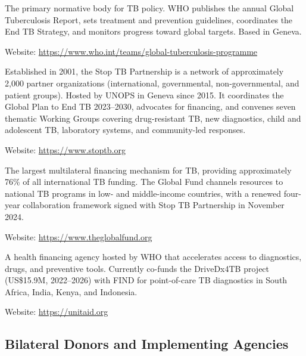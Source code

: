 \documentclass[11pt]{article}
\begin{document}
\begin{description}[style=nextline]

  \item[World Health Organization (WHO) -- Global TB Programme]
  The primary normative body for TB policy. WHO publishes the annual Global Tuberculosis Report, sets treatment and prevention guidelines, coordinates the End TB Strategy, and monitors progress toward global targets. Based in Geneva. 
  
  Website: \url{https://www.who.int/teams/global-tuberculosis-programme}

  \item[Stop TB Partnership]
  Established in 2001, the Stop TB Partnership is a network of approximately 2,000 partner organizations (international, governmental, non-governmental, and patient groups). Hosted by UNOPS in Geneva since 2015. It coordinates the Global Plan to End TB 2023--2030, advocates for financing, and convenes seven thematic Working Groups covering drug-resistant TB, new diagnostics, child and adolescent TB, laboratory systems, and community-led responses.
  
  Website: \url{https://www.stoptb.org}

  \item[The Global Fund to Fight AIDS, Tuberculosis and Malaria]
  The largest multilateral financing mechanism for TB, providing approximately 76\% of all international TB funding. The Global Fund channels resources to national TB programs in low- and middle-income countries, with a renewed four-year collaboration framework signed with Stop TB Partnership in November 2024. 
  
  Website: \url{https://www.theglobalfund.org}

  \item[Unitaid]
  A health financing agency hosted by WHO that accelerates access to diagnostics, drugs, and preventive tools. Currently co-funds the DriveDx4TB project (US\$15.9M, 2022--2026) with FIND for point-of-care TB diagnostics in South Africa, India, Kenya, and Indonesia. 
  
  Website: \url{https://unitaid.org}

\end{description}

\subsection{Bilateral Donors and Implementing Agencies}
\end{document}
